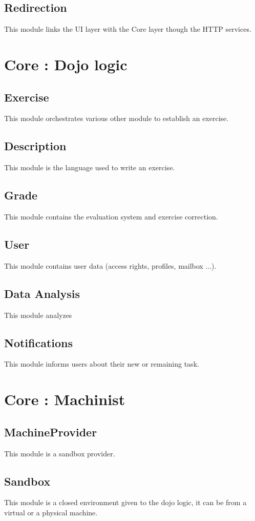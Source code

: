 	\subsection{Redirection}
		This module links the UI layer with the Core layer though the HTTP services.

\section{Core : Dojo logic}
	\subsection{Exercise}
		This module orchestrates various other module to establish an exercise.
	\subsection{Description}
		This module is the language used to write an exercise.
	\subsection{Grade}
		This module contains the evaluation system and exercise correction.
	\subsection{User}
		This module contains user data (access rights, profiles, mailbox ...).  
	\subsection{Data Analysis}	
		This module analyzes 
	\subsection{Notifications}
	 	This module informs users about their new or remaining task.
		
\section{Core : Machinist}
	\subsection{MachineProvider}
		This module is a sandbox provider.
	\subsection{Sandbox}
		This module is a closed environment given to the dojo logic, it can be from a virtual or a physical machine.

